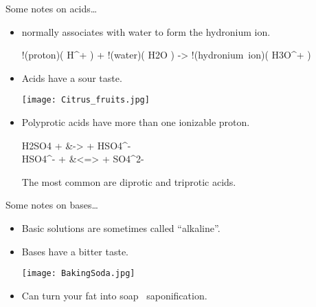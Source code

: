 \documentclass[notes=hide]{beamer}
\begin{document}
\begin{frame}{Some notes on acids\ldots}
	\begin{itemize}[<+->]
		\item {} normally associates with water to form the
			\alert{hydronium ion}.
			\begin{reaction*}
				!(proton)( H^{+}\aq{} ) + !(water)( H2O\lqd{} )
				-> !(hydronium~ion)( H3O^{+}\aq{} )
			\end{reaction*}
			
			\bigskip

		\item Acids have a sour taste. \hfill
			\parbox{0.5\linewidth}{
				\centering
				\texttt{[image: Citrus\_fruits.jpg]}
				}

			\bigskip
		\item \alert{Polyprotic} acids have more than one
			\alert{ionizable} proton.
			\begin{reactions*}
				H2SO4\aq{} + \water\lqd{} &-> \Oxo\aq{} +
				HSO4^{-}\aq{} \\
				HSO4^{-}\aq{} + \water\lqd{} &<=> \Oxo\aq{} +
				SO4^{2-}\aq{}
			\end{reactions*}
			The most common are \alert{diprotic} and
			\alert{triprotic} acids.
	\end{itemize}
\end{frame}

\begin{frame}{Some notes on bases\ldots}
	\begin{itemize}[<+->]
		\item Basic solutions are sometimes called ``alkaline''.

			\bigskip

		\item Bases have a bitter taste.\hfill
			\parbox{0.5\linewidth}{
				\centering
				\texttt{[image: BakingSoda.jpg]}
				}

			\bigskip

		\item Can turn your fat into soap \textrightarrow\
			\alert{saponification}.
	\end{itemize}
\end{frame}
\end{document}

